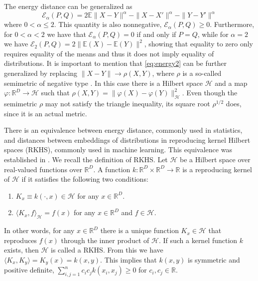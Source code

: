 \documentclass{article}
\def\Energy{\mathcal{E}}
\def\E{\mathbb{E}}
\begin{document}
The energy distance can be generalized as 
\begin{equation}\label{eq:energy2}
\Energy_\alpha(P, Q) = 2 \E \| X - Y\|^{\alpha} - \| X - X' \|^{\alpha} - 
\| Y - Y' \|^{\alpha}
\end{equation}
where $0<\alpha\le 2$. This quantity is also nonnegative,
$\Energy_\alpha(P,Q) \ge 0$. Furthermore, for $0<\alpha<2$ we have that
$\Energy_\alpha(P,Q) = 0$ if and only if $P=Q$, while for $\alpha=2$ 
we have $\Energy_2(P,Q) = 2\| \E(X) - \E(Y) \|^2$, showing that
equality to zero only requires
equality of the means and thus it does not imply equality of distributions.
It is important to 
mention that \eqref{eq:energy2} can be further generalized by
replacing
$\| X - Y\| \to \rho(X,Y)$, where $\rho$ is a so-called semimetric
of negative type \cite{Sejdinovic2013}. 
In this case there is a Hilbert space $\mathcal{H}$ and
a map $\varphi: \mathbb{R}^D \to
\mathcal{H}$ such that
$\rho(X, Y) = \| \varphi(X) - \varphi(Y) \|_{\mathcal{H}}^2$. 
Even though the semimetric 
$\rho$ may not satisfy the triangle inequality, its square
root $\rho^{1/2}$ does, since it is an actual metric.

There is an equivalence 
between energy distance, commonly used in statistics,
and distances between embeddings of distributions in reproducing
kernel Hilbert spaces (RKHS),
commonly used in machine learning. This equivalence was established
in \cite{Sejdinovic2013}. We recall the definition of
RKHS. Let $\mathcal{H}$ be a Hilbert space over real-valued functions
over $\mathbb{R}^D$. A function $k : \mathbb{R}^D \times \mathbb{R}^D \to 
\mathbb{R}$ is a reproducing kernel of $\mathcal{H}$ if it satisfies
the following two conditions:
\begin{enumerate}
\item $K_x \equiv k(\cdot, x) \in \mathcal{H}$ for any $x \in \mathbb{R}^D$.
\item $\langle K_x, f \rangle_{\mathcal{H}} = f(x)$ for
any $x\in\mathbb{R}^D$ and $f\in \mathcal{H}$.
\end{enumerate}
In other words, for any $x \in \mathbb{R}^D$ there is a unique function
$K_x \in \mathcal{H}$ that reproduces $f(x)$ through the inner product
of $\mathcal{H}$.
If such a kernel function $k$ exists, then $\mathcal{H}$ is called a RKHS.
From this we have $\langle K_x, K_y \rangle = K_y(x) = k(x,y)$. This implies
that $k(x,y)$ is symmetric and positive definite, $\sum_{i,j=1}^n c_i c_j
k(x_i,x_j) \ge 0$ for $c_i,c_j \in \mathbb{R}$.
\end{document}
